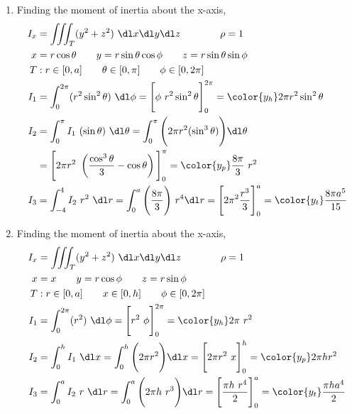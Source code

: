 \begin{enumerate}
    \item Finding the moment of inertia about the x-axis,
          \begin{align}
              I_x & = \iiint_T (y^2 + z^2)\ \dl x \dl y \dl z \qquad\qquad \rho = 1 \\
              x   & = r \cos \theta \qquad y = r\sin \theta \cos \phi
              \qquad z = r \sin \theta \sin \phi                                    \\
              T   & : r \in [0, a] \qquad \theta \in [0, \pi]
              \qquad \phi \in [0, 2\pi]                                             \\
              I_1 & = \int_{0}^{2\pi} (r^2 \sin^2 \theta )\ \dl \phi
              = \Bigg[ \phi\ r^2 \sin^2 \theta \Bigg]_{0}^{2\pi}
              = {\color{y_h} 2\pi r^2 \sin^2 \theta}                                \\
              I_2 & = \int_{0}^{\pi} I_1 \ (\sin \theta)\ \dl \theta
              = \int_{0}^{\pi} \Bigg( 2\pi r^2 ( \sin^3 \theta)  \Bigg) \dl \theta  \\
                  & = \Bigg[  2\pi r^2\ \left( \frac{\cos^3 \theta}{3}
                  - \cos \theta \right) \Bigg]_{0}^{\pi}
              = {\color{y_p} \frac{8\pi}{3}\ r^2 }                                  \\
              I_3 & = \int_{-4}^{4} I_2 \ r^2\ \dl r = \int_{0}^{a}
              \Bigg( \frac{8\pi}{3} \Bigg)\ r^4 \dl r
              = \Bigg[ 2\pi^2 \frac{r^3}{3} \Bigg]_{0}^{a}
              = {\color{y_t} \frac{8\pi a^5}{15}}
          \end{align}

    \item Finding the moment of inertia about the x-axis,
          \begin{align}
              I_x & = \iiint_T (y^2 + z^2)\ \dl x \dl y \dl z \qquad\qquad \rho = 1 \\
              x   & = x \qquad y = r \cos \phi \qquad z = r \sin \phi               \\
              T   & : r \in [0, a] \qquad x \in [0, h]
              \qquad \phi \in [0, 2\pi]                                             \\
              I_1 & = \int_{0}^{2\pi} (r^2) \ \dl \phi
              = \Bigg[ r^2\ \phi \Bigg]_{0}^{2\pi}
              = {\color{y_h} 2\pi\ r^2}                                             \\
              I_2 & = \int_{0}^{h} I_1 \ \dl x
              = \int_{0}^{h} \Bigg( 2\pi r^2 \Bigg) \dl x
              = \Bigg[ 2\pi r^2\ x \Bigg]_{0}^{h}
              = {\color{y_p} 2\pi h r^2 }                                           \\
              I_3 & = \int_{0}^{a} I_2\ r\ \dl r = \int_{0}^{a}
              \Bigg( 2\pi h\ r^3 \Bigg) \dl r
              = \Bigg[ \frac{\pi h\ r^4}{2} \Bigg]_{0}^{a}
              = {\color{y_t} \frac{\pi h a^4}{2}}
          \end{align}


\end{enumerate}
